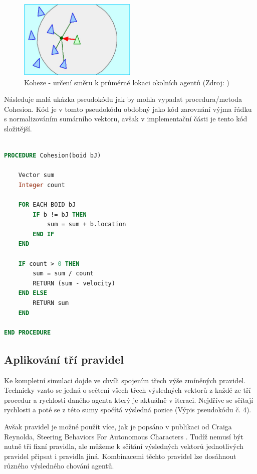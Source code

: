 \documentclass[czech,public,dept460,male,cpdeclaration]{diploma}
\begin{document}
\begin{figure}[H]\centering\includegraphics[width=0.5\textwidth]{Figures/cohesion.jpg}
	\caption{Koheze - určení směru k průměrné lokaci okolních agentů (Zdroj: \cite{link2})}
\end{figure}

Následuje malá ukázka pseudokódu jak by mohla vypadat procedura/metoda Cohesion. Kód je v tomto pseudokódu obdobný jako kód zarovnání výjma řádku s normalizováním sumárního vektoru, avšak v implementační části je tento kód složitější.

\begin{lstlisting}[language=pascal,label=src:Cohesion pseudocode,caption=Pseudokód pro kohezi]

PROCEDURE Cohesion(boid bJ)

	Vector sum
	Integer count
	
	FOR EACH BOID bJ
		IF b != bJ THEN
			sum = sum + b.location
		END IF
	END
	
	IF count > 0 THEN
		sum = sum / count
		RETURN (sum - velocity)
	END ELSE
		RETURN sum
	END

END PROCEDURE

\end{lstlisting}

\subsection{Aplikování tří pravidel}
Ke kompletní simulaci dojde ve chvíli spojením třech výše zmíněných pravidel. Technicky vzato se jedná o sečtení všech třech výsledných vektorů z každé ze tří procedur a rychlosti daného agenta který je aktuálně v iteraci. Nejdříve se sčítají rychlosti a poté se z této sumy spočítá výsledná pozice (Výpis pseudokódu č. 4).

Avšak pravidel je možné použít více, jak je popsáno v publikaci od Craiga Reynolda, Steering Behaviors For Autonomous Characters \cite{linkToSteeringBehaviors}. Tudíž nemusí být nutně tři fixní pravidla, ale můžeme k sčítání výsledných vektorů jednotlivých pravidel připsat i pravidla jiná. Kombinacemi těchto pravidel lze dosáhnout různého výsledného chování agentů.
\end{document}
